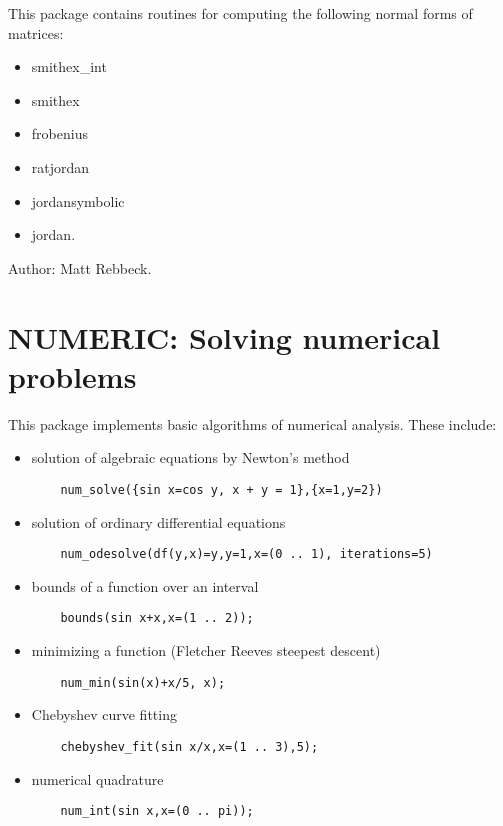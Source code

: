 This package contains routines for computing the following
normal forms of matrices:
\begin{itemize}
\item smithex\_int
\item smithex
\item frobenius
\item ratjordan
\item jordansymbolic
\item jordan.
\end{itemize}

Author: Matt Rebbeck.



\newpage

\section{NUMERIC: Solving numerical problems}
This package implements basic algorithms of numerical analysis.
These include:
\begin{itemize}
\item solution of algebraic equations by Newton's method
\begin{verbatim}
    num_solve({sin x=cos y, x + y = 1},{x=1,y=2})
\end{verbatim}
\item solution of ordinary differential equations
\begin{verbatim}
    num_odesolve(df(y,x)=y,y=1,x=(0 .. 1), iterations=5)
\end{verbatim}
\item bounds of a function over an interval
\begin{verbatim}
    bounds(sin x+x,x=(1 .. 2));
\end{verbatim}
\item minimizing a function (Fletcher Reeves steepest descent)
\begin{verbatim}
    num_min(sin(x)+x/5, x);
\end{verbatim}
\item Chebyshev curve fitting
\begin{verbatim}
    chebyshev_fit(sin x/x,x=(1 .. 3),5);
\end{verbatim}
\item numerical quadrature
\begin{verbatim}
    num_int(sin x,x=(0 .. pi));
\end{verbatim}
\end{itemize}

